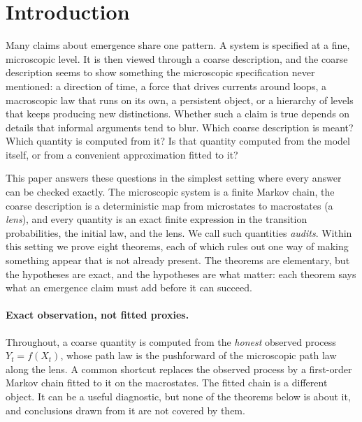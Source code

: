 \section{Introduction}\label{sec:introduction}

Many claims about emergence share one pattern.
A system is specified at a fine, microscopic level.
It is then viewed through a coarse description, and the coarse description seems to show something the microscopic specification never mentioned: a direction of time, a force that drives currents around loops, a macroscopic law that runs on its own, a persistent object, or a hierarchy of levels that keeps producing new distinctions.
Whether such a claim is true depends on details that informal arguments tend to blur.
Which coarse description is meant?
Which quantity is computed from it?
Is that quantity computed from the model itself, or from a convenient approximation fitted to it?

This paper answers these questions in the simplest setting where every answer can be checked exactly.
The microscopic system is a finite Markov chain, the coarse description is a deterministic map from microstates to macrostates (a \emph{lens}), and every quantity is an exact finite expression in the transition probabilities, the initial law, and the lens.
We call such quantities \emph{audits}.
Within this setting we prove eight theorems, each of which rules out one way of making something appear that is not already present.
The theorems are elementary, but the hypotheses are exact, and the hypotheses are what matter: each theorem says what an emergence claim must add before it can succeed.

\paragraph{Exact observation, not fitted proxies.}
Throughout, a coarse quantity is computed from the \emph{honest} observed process $Y_t=f(X_t)$, whose path law is the pushforward of the microscopic path law along the lens.
A common shortcut replaces the observed process by a first-order Markov chain fitted to it on the macrostates.
The fitted chain is a different object.
It can be a useful diagnostic, but none of the theorems below is about it, and conclusions drawn from it are not covered by them.

